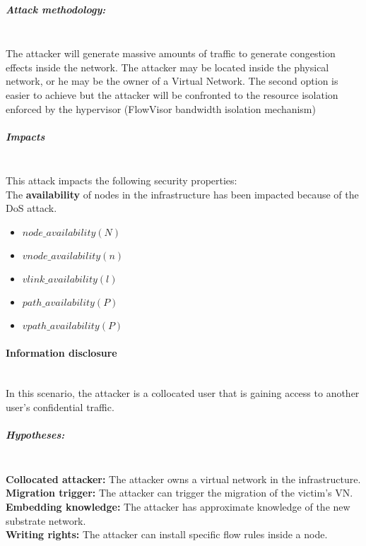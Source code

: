 \subparagraph{Attack methodology:}\textbf{\\}
The attacker will generate massive amounts of traffic to generate congestion effects inside the network. The attacker may be located inside the physical network, or he may be the owner of a Virtual Network. The second option is easier to achieve but the attacker will be confronted to the resource isolation enforced by the hypervisor (\ie FlowVisor bandwidth isolation mechanism)


\subparagraph{Impacts}\textbf{\\}
This attack impacts the following security properties:\\
The \textbf{availability} of nodes in the infrastructure has been impacted because of the DoS attack.
\begin{itemize}
    \item $node\_availability(N)$
    \item $vnode\_availability(n)$
    \item $vlink\_availability(l)$
    \item $path\_availability(P)$
    \item $vpath\_availability(P)$
\end{itemize}

\paragraph{Information disclosure}\textbf{\\}
In this scenario, the attacker is a collocated user that is gaining access to another user's confidential traffic. 
\subparagraph{Hypotheses:}\textbf{\\}
\textbf{Collocated attacker:} The attacker owns a virtual network in the infrastructure.\\
\textbf{Migration trigger:} The attacker can trigger the migration of the victim's VN.\\
\textbf{Embedding knowledge:} The attacker has approximate knowledge of the new substrate network.\\
\textbf{Writing rights:} The attacker can install specific flow rules inside a node.

